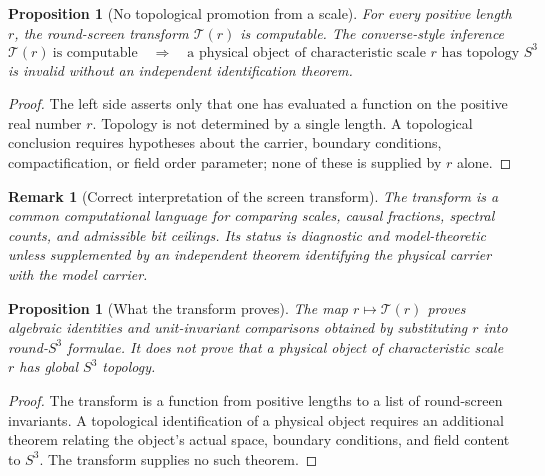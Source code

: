 \documentclass[11pt,a4paper]{article}
\newtheorem{proposition}[theorem]{Proposition}
\newtheorem{remark}[theorem]{Remark}
\begin{document}
\begin{proposition}[No topological promotion from a scale]
For every positive length $r$, the round-screen transform $\mathcal T(r)$ is computable.  The converse-style inference
\[
\mathcal T(r)\ \text{is computable}
\quad\Longrightarrow\quad
\text{a physical object of characteristic scale }r\text{ has topology }S^3
\]
is invalid without an independent identification theorem.
\end{proposition}
\begin{proof}
The left side asserts only that one has evaluated a function on the positive real number $r$.  Topology is not determined by a single length.  A topological conclusion requires hypotheses about the carrier, boundary conditions, compactification, or field order parameter; none of these is supplied by $r$ alone.
\end{proof}

\begin{remark}[Correct interpretation of the screen transform]
The transform is a common computational language for comparing scales, causal fractions, spectral counts, and admissible bit ceilings.  Its status is diagnostic and model-theoretic unless supplemented by an independent theorem identifying the physical carrier with the model carrier.
\end{remark}

\begin{proposition}[What the transform proves]
The map $r\mapsto\mathcal T(r)$ proves algebraic identities and unit-invariant comparisons obtained by substituting $r$ into round-$S^3$ formulae.  It does not prove that a physical object of characteristic scale $r$ has global $S^3$ topology.
\end{proposition}
\begin{proof}
The transform is a function from positive lengths to a list of round-screen invariants.  A topological identification of a physical object requires an additional theorem relating the object's actual space, boundary conditions, and field content to $S^3$.  The transform supplies no such theorem.
\end{proof}
\end{document}
